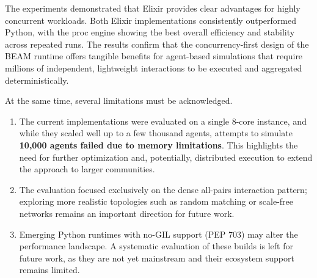 \documentclass[
]{ceurart}
\begin{document}
The experiments demonstrated that Elixir provides clear advantages for highly concurrent workloads. Both Elixir implementations consistently outperformed Python, with the proc engine showing the best overall efficiency and stability across repeated runs. The results confirm that the concurrency-first design of the BEAM runtime offers tangible benefits for agent-based simulations that require millions of independent, lightweight interactions to be executed and aggregated deterministically.

At the same time, several limitations must be acknowledged. 
\begin{enumerate}
    \item The current implementations were evaluated on a single 8-core instance, and while they scaled well up to a few thousand agents, attempts to simulate \textbf{10,000 agents failed due to memory limitations}. This highlights the need for further optimization and, potentially, distributed execution to extend the approach to larger communities. 
    \item The evaluation focused exclusively on the dense all-pairs interaction pattern; exploring more realistic topologies such as random matching or scale-free networks remains an important direction for future work. 
    \item Emerging Python runtimes with no-GIL support (PEP 703) may alter the performance landscape. A systematic evaluation of these builds is left for future work, as they are not yet mainstream and their ecosystem support remains limited.
\end{enumerate}
\end{document}
